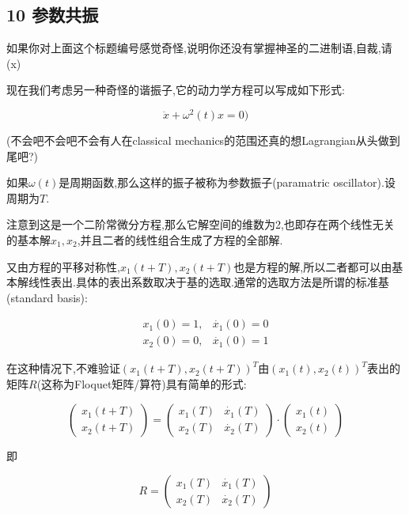 \documentclass[UTF8]{article}
\begin{document}
	\newpage





	
	
	\subsection*{10 参数共振}
	
	如果你对上面这个标题编号感觉奇怪,说明你还没有掌握神圣的二进制语,自裁,请(x)
	
	现在我们考虑另一种奇怪的谐振子,它的动力学方程可以写成如下形式:
	
	\[\ddot{x}+\omega^2(t)x=0)\]
	
	(不会吧不会吧不会有人在classical mechanics的范围还真的想Lagrangian从头做到尾吧?)
	
	如果$\omega(t)$是周期函数,那么这样的振子被称为参数振子(paramatric oscillator).设周期为$T$.
	
	注意到这是一个二阶常微分方程,那么它解空间的维数为2,也即存在两个线性无关的基本解$x_1,x_2$,并且二者的线性组合生成了方程的全部解.
	
	又由方程的平移对称性,$x_1(t+T),x_2(t+T)$也是方程的解,所以二者都可以由基本解线性表出.具体的表出系数取决于基的选取.通常的选取方法是所谓的标准基(standard basis):
	
	\[
	\begin{matrix}
		x_1(0)=1,&\dot{x_1}(0)=0\\
		x_2(0)=0,&\dot{x_1}(0)=1
	\end{matrix}
	\]
		
	在这种情况下,不难验证$(x_1(t+T),x_2(t+T))^T$由$(x_1(t),x_2(t))^T$表出的矩阵$R$(这称为Floquet矩阵/算符)具有简单的形式:
	
	\[
		\begin{pmatrix}
			x_1(t+T)
			\\x_2(t+T)
		\end{pmatrix}
		=
		\begin{pmatrix}
			x_1(T)&\dot{x_1}(T)\\
			x_2(T)&\dot{x_2}(T)
		\end{pmatrix}
		\cdot
		\begin{pmatrix}
			x_1(t)
			\\x_2(t)
		\end{pmatrix}
	\]
	
	即
	
	\[
		R=
		\begin{pmatrix}
			x_1(T)&\dot{x_1}(T)\\
			x_2(T)&\dot{x_2}(T)
		\end{pmatrix}
	\]
	
\end{document}
